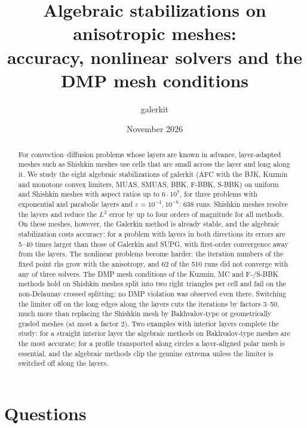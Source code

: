\documentclass[11pt]{article}
\title{Algebraic stabilizations on anisotropic meshes:\\ accuracy, nonlinear solvers and the DMP mesh conditions}
\author{galerkit}
\date{November 2026}
\newcommand{\eps}{\varepsilon}
\begin{document}
\maketitle

\begin{abstract}
For convection--diffusion problems whose layers are known in advance, layer-adapted meshes such as Shishkin meshes
use cells that are small across the layer and long along it. We study the eight algebraic stabilizations of galerkit
(AFC with the BJK, Kuzmin and monotone convex limiters, MUAS, SMUAS, BBK, F-BBK, S-BBK) on uniform and Shishkin meshes
with aspect ratios up to $6\cdot10^7$, for three problems with exponential and parabolic layers and
$\eps=10^{-4},10^{-8}$: 638 runs. Shishkin meshes resolve the layers and reduce the $L^2$ error by up to four orders of
magnitude for all methods. On these meshes, however, the Galerkin method is already stable, and the algebraic
stabilization costs accuracy: for a problem with layers in both directions its errors are 5--40 times larger than
those of Galerkin and SUPG, with first-order convergence away from the layers. The nonlinear problems become harder:
the iteration numbers of the fixed point rhs grow with the anisotropy, and 62 of the 510 runs did not converge with any
of three solvers. The DMP mesh conditions of the Kuzmin, MC and F-/S-BBK methods hold on Shishkin meshes split into two
right triangles per cell and fail on the non-Delaunay crossed splitting; no DMP violation was observed even there.
Switching the limiter off on the long edges along the layers cuts the iterations by factors 3--50, much more than
replacing the Shishkin mesh by Bakhvalov-type or geometrically graded meshes (at most a factor 2). Two examples with interior layers complete the study: for a straight interior layer the algebraic methods on
Bakhvalov-type meshes are the most accurate; for a profile transported along circles a layer-aligned polar mesh is
essential, and the algebraic methods clip the genuine extrema unless the limiter is switched off along the layers.
\end{abstract}

\tableofcontents

\section{Questions}
\end{document}
